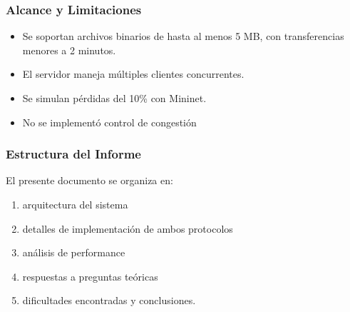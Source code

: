 \subsubsection*{Alcance y Limitaciones}
\begin{itemize}
    
\item Se soportan archivos binarios de hasta al menos 5 MB, con transferencias menores a 2 minutos.

\item El servidor maneja múltiples clientes concurrentes.

\item Se simulan pérdidas del 10\% con Mininet.

\item No se implementó control de congestión

\end{itemize}

\subsubsection*{Estructura del Informe}
El presente documento se organiza en:
\begin{enumerate}[label=\roman*. ,leftmargin=2cm]
    \item arquitectura del sistema
    \item detalles de implementación de ambos protocolos
    \item análisis de performance
    \item respuestas a preguntas teóricas
    \item dificultades encontradas y conclusiones.
\end{enumerate}